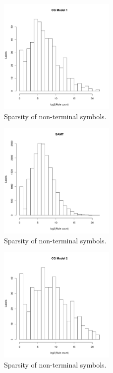 \documentclass{article}
\begin{document}
\begin{figure}[t]
\includegraphics[width=0.5\textwidth]{figures/ccg}
\caption{Sparsity of non-terminal symbols.}
\end{figure}

\begin{figure}[t]
\includegraphics[width=0.5\textwidth]{figures/samt}
\caption{Sparsity of non-terminal symbols.}
\end{figure}

\begin{figure}[t]
\includegraphics[width=0.5\textwidth]{figures/ccg-auli}
\caption{Sparsity of non-terminal symbols.\label{fig:hist4}}
\end{figure}
\end{document}
